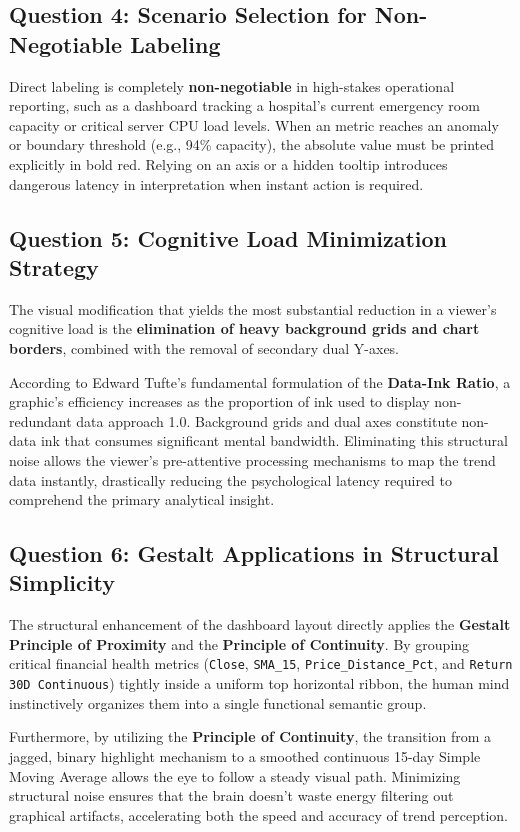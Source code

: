 \documentclass[a4paper,12pt]{extarticle}
\begin{document}
\subsection{Question 4: Scenario Selection for Non-Negotiable Labeling}
Direct labeling is completely \textbf{non-negotiable} in high-stakes operational reporting, such as a dashboard tracking a hospital's current emergency room capacity or critical server CPU load levels. When an metric reaches an anomaly or boundary threshold (e.g., 94\% capacity), the absolute value must be printed explicitly in bold red. Relying on an axis or a hidden tooltip introduces dangerous latency in interpretation when instant action is required.

\subsection{Question 5: Cognitive Load Minimization Strategy}
The visual modification that yields the most substantial reduction in a viewer's cognitive load is the \textbf{elimination of heavy background grids and chart borders}, combined with the removal of secondary dual Y-axes. 

According to Edward Tufte's fundamental formulation of the \textbf{Data-Ink Ratio}, a graphic's efficiency increases as the proportion of ink used to display non-redundant data approach 1.0. Background grids and dual axes constitute non-data ink that consumes significant mental bandwidth. Eliminating this structural noise allows the viewer's pre-attentive processing mechanisms to map the trend data instantly, drastically reducing the psychological latency required to comprehend the primary analytical insight.

\subsection{Question 6: Gestalt Applications in Structural Simplicity}
The structural enhancement of the dashboard layout directly applies the \textbf{Gestalt Principle of Proximity} and the \textbf{Principle of Continuity}. By grouping critical financial health metrics (\texttt{Close}, \texttt{SMA\_15}, \texttt{Price\_Distance\_Pct}, and \texttt{Return 30D Continuous}) tightly inside a uniform top horizontal ribbon, the human mind instinctively organizes them into a single functional semantic group. 

Furthermore, by utilizing the \textbf{Principle of Continuity}, the transition from a jagged, binary highlight mechanism to a smoothed continuous 15-day Simple Moving Average allows the eye to follow a steady visual path. Minimizing structural noise ensures that the brain doesn't waste energy filtering out graphical artifacts, accelerating both the speed and accuracy of trend perception.
\end{document}
